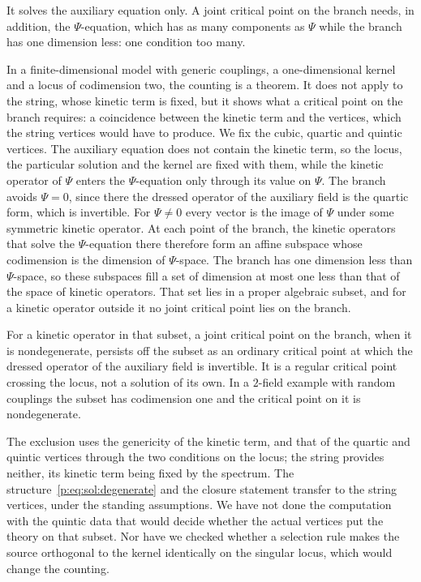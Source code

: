 It solves the auxiliary equation only.
A joint critical point on the branch needs, in addition, the $\Psi$-equation, which has as many components as $\Psi$ while the branch has one dimension less: one condition too many.

In a finite-dimensional model with generic couplings, a one-dimensional kernel and a locus of codimension two, the counting is a theorem.
It does not apply to the string, whose kinetic term is fixed, but it shows what a critical point on the branch requires: a coincidence between the kinetic term and the vertices, which the string vertices would have to produce.
We fix the cubic, quartic and quintic vertices.
The auxiliary equation does not contain the kinetic term, so the locus, the particular solution and the kernel are fixed with them, while the kinetic operator of $\Psi$ enters the $\Psi$-equation only through its value on $\Psi$.
The branch avoids $\Psi = 0$, since there the dressed operator of the auxiliary field is the quartic form, which is invertible.
For $\Psi \neq 0$ every vector is the image of $\Psi$ under some symmetric kinetic operator.
At each point of the branch, the kinetic operators that solve the $\Psi$-equation there therefore form an affine subspace whose codimension is the dimension of $\Psi$-space.
The branch has one dimension less than $\Psi$-space, so these subspaces fill a set of dimension at most one less than that of the space of kinetic operators.
That set lies in a proper algebraic subset, and for a kinetic operator outside it no joint critical point lies on the branch.

For a kinetic operator in that subset, a joint critical point on the branch, when it is nondegenerate, persists off the subset as an ordinary critical point at which the dressed operator of the auxiliary field is invertible.
It is a regular critical point crossing the locus, not a solution of its own.
In a $2$-field example with random couplings the subset has codimension one and the critical point on it is nondegenerate.

The exclusion uses the genericity of the kinetic term, and that of the quartic and quintic vertices through the two conditions on the locus; the string provides neither, its kinetic term being fixed by the spectrum.
The structure~\eqref{p:eq:sol:degenerate} and the closure statement transfer to the string vertices, under the standing assumptions.
We have not done the computation with the quintic data that would decide whether the actual vertices put the theory on that subset.
Nor have we checked whether a selection rule makes the source orthogonal to the kernel identically on the singular locus, which would change the counting.

